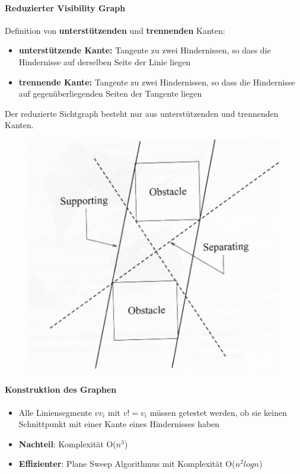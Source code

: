 \paragraph{Reduzierter Visibility Graph}
Definition von \textbf{unterstützenden} und \textbf{trennenden} Kanten:
\begin{itemize}
	\item \textbf{unterstützende Kante:} Tangente zu zwei Hindernissen, so dass die Hindernisse auf derselben Seite der Linie liegen
	\item \textbf{trennende Kante:} Tangente zu zwei Hindernissen, so dass die Hindernisse auf gegenüberliegenden Seiten der Tangente liegen
\end{itemize}
Der reduzierte Sichtgraph besteht nur aus unterstützenden und trennenden Kanten.
\begin{figure}[H]
	\begin{center}
		\includegraphics[scale=0.4]{Resources/PNG/SichtGraphReduziert}
		\caption{}
		\label{fig:PNG/SichtGraphReduziert.PNG}
	\end{center}
\end{figure}
\paragraph{Konstruktion des Graphen}
\begin{itemize}
	\item Alle Liniensegmente $vv_i$ mit $v != v_i$ müssen getestet werden, ob sie keinen Schnittpunkt mit einer Kante eines Hindernisses haben
	\item \textbf{Nachteil}: Komplexität O($n^3$)
	\item \textbf{Effizienter}: Plane Sweep Algorithmus mit Komplexität O($n^2 log n$)
\end{itemize}
